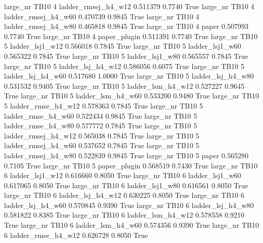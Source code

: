   large_nr     TB10                 4 ladder_rmsej_h4_w12   0.511379      0.7740    True
  large_nr     TB10                 4 ladder_rmsej_h4_w60   0.470739      0.9845    True
  large_nr     TB10                 4 ladder_rmsej_h4_w80   0.465818      0.9845    True
  large_nr     TB10                 4               paper   0.507993      0.7740    True
  large_nr     TB10                 4        paper_plugin   0.511391      0.7740    True
  large_nr     TB10                 5     ladder_lsj1_w12   0.566018      0.7845    True
  large_nr     TB10                 5     ladder_lsj1_w60   0.565322      0.7845    True
  large_nr     TB10                 5     ladder_lsj1_w80   0.565557      0.7845    True
  large_nr     TB10                 5   ladder_lsj_h4_w12   0.586056      0.6075    True
  large_nr     TB10                 5   ladder_lsj_h4_w60   0.517680      1.0000    True
  large_nr     TB10                 5   ladder_lsj_h4_w80   0.531532      0.9405    True
  large_nr     TB10                 5   ladder_lsm_h4_w12   0.527227      0.9645    True
  large_nr     TB10                 5   ladder_lsm_h4_w60   0.533200      0.9480    True
  large_nr     TB10                 5  ladder_rmse_h4_w12   0.578363      0.7845    True
  large_nr     TB10                 5  ladder_rmse_h4_w60   0.522434      0.9845    True
  large_nr     TB10                 5  ladder_rmse_h4_w80   0.577772      0.7845    True
  large_nr     TB10                 5 ladder_rmsej_h4_w12   0.565038      0.7845    True
  large_nr     TB10                 5 ladder_rmsej_h4_w60   0.537652      0.7845    True
  large_nr     TB10                 5 ladder_rmsej_h4_w80   0.522839      0.9845    True
  large_nr     TB10                 5               paper   0.565280      0.7105    True
  large_nr     TB10                 5        paper_plugin   0.568519      0.7430    True
  large_nr     TB10                 6     ladder_lsj1_w12   0.616660      0.8050    True
  large_nr     TB10                 6     ladder_lsj1_w60   0.617065      0.8050    True
  large_nr     TB10                 6     ladder_lsj1_w80   0.616561      0.8050    True
  large_nr     TB10                 6   ladder_lsj_h4_w12   0.630225      0.8050    True
  large_nr     TB10                 6   ladder_lsj_h4_w60   0.570845      0.9390    True
  large_nr     TB10                 6   ladder_lsj_h4_w80   0.581822      0.8385    True
  large_nr     TB10                 6   ladder_lsm_h4_w12   0.578558      0.9210    True
  large_nr     TB10                 6   ladder_lsm_h4_w60   0.574356      0.9390    True
  large_nr     TB10                 6  ladder_rmse_h4_w12   0.626728      0.8050    True
